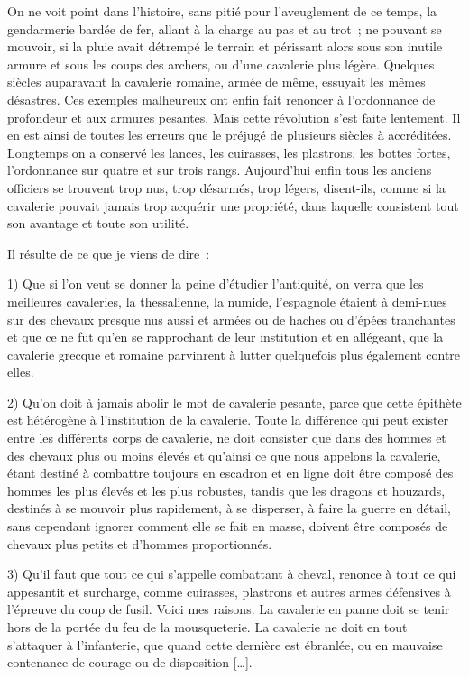 \documentclass[french,twoside]{book} %
\begin{document}
On ne voit point dans l’histoire, sans pitié pour l’aveuglement de ce temps, la gendarmerie bardée de fer, allant à la charge au pas et au trot ; ne pouvant se mouvoir, si la pluie avait détrempé le terrain et périssant alors sous son inutile armure et sous les coups des archers, ou d’une cavalerie plus légère. Quelques siècles auparavant la cavalerie romaine, armée de même, essuyait les mêmes désastres. Ces exemples malheureux ont enfin fait renoncer à l’ordonnance de profondeur et aux armures pesantes. Mais cette révolution s’est faite lentement. Il en est ainsi de toutes les erreurs que le préjugé de plusieurs siècles à accréditées. Longtemps on a conservé les lances, les cuirasses, les plastrons, les bottes fortes, l’ordonnance sur quatre et sur trois rangs. Aujourd’hui enfin tous les anciens officiers se trouvent trop nus, trop désarmés, trop légers, disent-ils, comme si la cavalerie pouvait jamais trop acquérir une propriété, dans laquelle consistent tout son avantage et toute son utilité.\par
Il résulte de ce que je viens de dire :\par
1) Que si l’on veut se donner la peine d’étudier l’antiquité, on verra que les meilleures cavaleries, la thessalienne, la numide, l’espagnole étaient à demi-nues sur des chevaux presque nus aussi et armées ou de haches ou d’épées tranchantes et que ce ne fut qu’en se rapprochant de leur institution et en allégeant, que la cavalerie grecque et romaine parvinrent à lutter quelquefois plus également contre elles.\par
2) Qu’on doit à jamais abolir le mot de cavalerie pesante, parce que cette épithète est hétérogène à l’institution de la cavalerie. Toute la différence qui peut exister entre les différents corps de cavalerie, ne doit consister que dans des hommes et des chevaux plus ou moins élevés et qu’ainsi ce que nous appelons la cavalerie, étant destiné à combattre toujours en escadron et en ligne doit être composé des hommes les plus élevés et les plus robustes, tandis que les dragons et houzards, destinés à se mouvoir plus rapidement, à se disperser, à faire la guerre en détail, sans cependant ignorer comment elle se fait en masse, doivent être composés de chevaux plus petits et d’hommes proportionnés.\par
3) Qu’il faut que tout ce qui s’appelle combattant à cheval, renonce à tout ce qui appesantit et surcharge, comme cuirasses, plastrons et autres armes défensives à l’épreuve du coup de fusil. Voici mes raisons. La cavalerie en panne doit se tenir hors de la portée du feu de la mousqueterie. La cavalerie ne doit en tout s’attaquer à l’infanterie, que quand cette dernière est ébranlée, ou en mauvaise contenance de courage ou de disposition […].\par
\end{document}
